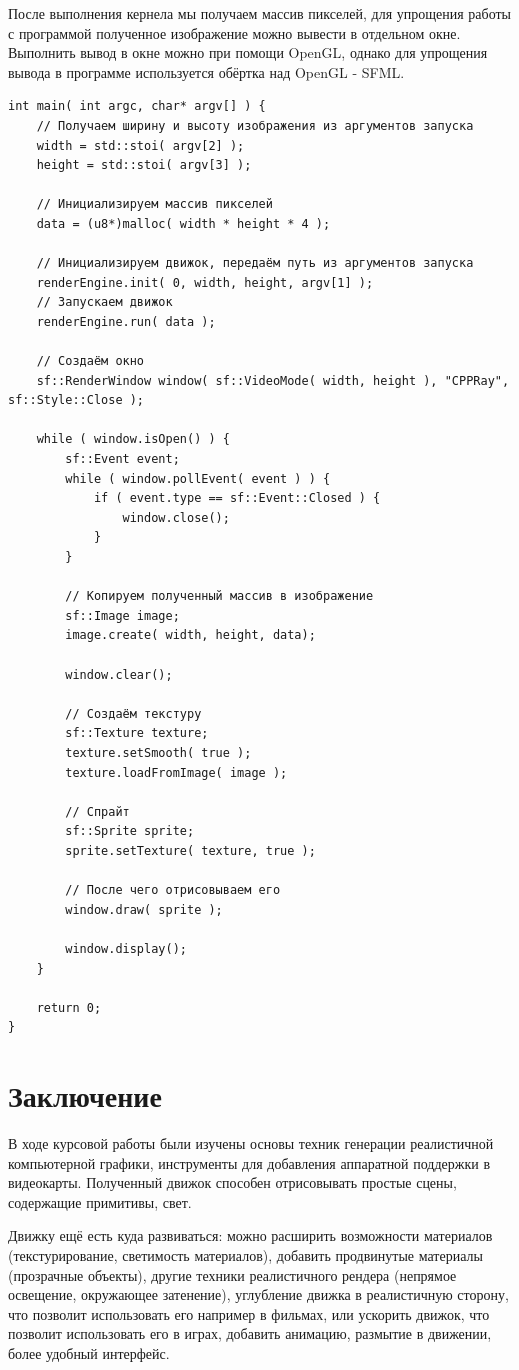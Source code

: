 \documentclass[a4paper,14pt]{extarticle}
\begin{document}
После выполнения кернела мы получаем массив пикселей, для упрощения работы с программой полученное изображение можно вывести в отдельном окне.
Выполнить вывод в окне можно при помощи OpenGL, однако для упрощения вывода в программе используется обёртка над OpenGL - SFML.
\begin{verbatim}
int main( int argc, char* argv[] ) {
    // Получаем ширину и высоту изображения из аргументов запуска
    width = std::stoi( argv[2] );
	height = std::stoi( argv[3] );

    // Инициализируем массив пикселей
	data = (u8*)malloc( width * height * 4 );
	
    // Инициализируем движок, передаём путь из аргументов запуска
    renderEngine.init( 0, width, height, argv[1] );
    // Запускаем движок
	renderEngine.run( data );

    // Создаём окно
	sf::RenderWindow window( sf::VideoMode( width, height ), "CPPRay", sf::Style::Close );

	while ( window.isOpen() ) {
		sf::Event event;
		while ( window.pollEvent( event ) ) {
			if ( event.type == sf::Event::Closed ) {
				window.close();
			}
		}

        // Копируем полученный массив в изображение 
		sf::Image image;
		image.create( width, height, data);

		window.clear();

        // Создаём текстуру
		sf::Texture texture;
		texture.setSmooth( true );
		texture.loadFromImage( image );

        // Спрайт
		sf::Sprite sprite;
		sprite.setTexture( texture, true );

        // После чего отрисовываем его
		window.draw( sprite );

		window.display();
	}

	return 0;
}
\end{verbatim}

\newpage
\section{Заключение}

В ходе курсовой работы были изучены основы техник генерации реалистичной компьютерной графики, 
инструменты для добавления аппаратной поддержки в видеокарты.
Полученный движок способен отрисовывать простые сцены, содержащие примитивы, свет.

Движку ещё есть куда развиваться: можно расширить возможности материалов (текстурирование, светимость материалов), 
добавить продвинутые материалы (прозрачные объекты), 
другие техники реалистичного рендера (непрямое освещение, окружающее затенение), 
углубление движка в реалистичную сторону, что позволит использовать его например в фильмах, 
или ускорить движок, что позволит использовать его в играх, 
добавить анимацию, размытие в движении, более удобный интерфейс.
\end{document}
